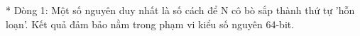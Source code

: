 * Dòng 1: Một số nguyên duy nhất là số cách để N cô bò sắp thành thứ tự 'hỗn loạn'. Kết quả đảm bảo nằm trong phạm vi kiểu số nguyên 64-bit.